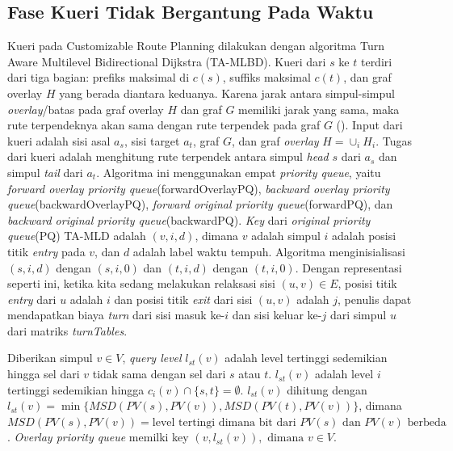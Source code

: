 \subsection{Fase Kueri Tidak Bergantung Pada Waktu}
\label{subsec:tdcrp-kueri}
Kueri pada Customizable Route Planning dilakukan dengan algoritma Turn Aware Multilevel Bidirectional Dijkstra (TA-MLBD). Kueri dari $s$ ke $t$ terdiri dari tiga bagian: prefiks maksimal di $c(s)$, suffiks maksimal $c(t)$, dan graf overlay $H$ yang berada diantara keduanya. Karena jarak antara simpul-simpul \textit{overlay}/batas pada graf overlay $H$ dan graf $G$ memiliki jarak yang sama, maka rute terpendeknya akan sama dengan rute terpendek pada graf $G$ (\cite{Delling2015}). Input dari kueri adalah sisi asal $a_s$, sisi target $a_t$, graf $G$, dan graf \textit{overlay} $H =\cup_i H_i$. Tugas dari kueri adalah menghitung rute terpendek antara simpul \textit{head} $s$ dari $a_s$ dan simpul \textit{tail} dari $a_t$. Algoritma ini menggunakan empat \textit{priority queue}, yaitu \textit{forward overlay priority queue}(forwardOverlayPQ), \textit{backward overlay priority queue}(backwardOverlayPQ), \textit{forward original priority queue}(forwardPQ), dan \textit{backward original priority queue}(backwardPQ). \textit{Key} dari \textit{original priority queue}(PQ) TA-MLD adalah $(v,i,d)$, dimana $v$ adalah simpul $i$ adalah posisi titik \textit{entry} pada $v$, dan $d$ adalah label waktu tempuh. Algoritma menginisialisasi $(s,i,d)$ dengan $(s,i,0)$ dan $(t,i,d)$ dengan $(t,i,0)$. Dengan representasi seperti ini, ketika kita sedang melakukan relaksasi sisi $(u,v)\in E$, posisi titik \textit{entry} dari $u$ adalah $i$ dan posisi titik \textit{exit} dari sisi $(u,v)$ adalah $j$, penulis dapat mendapatkan biaya \textit{turn}  dari sisi masuk ke-$i$ dan sisi keluar ke-$j$ dari simpul $u$  dari matriks \textit{turnTables}.

Diberikan simpul $v\in V$, \textit{query level} $l_{st}(v)$ adalah level tertinggi sedemikian hingga sel dari $v$ tidak sama dengan sel dari $s$ atau $t$. $l_{st}(v)$ adalah level $i$ tertinggi sedemikian hingga $c_i(v)\cap\{s,t\}=\emptyset$. $l_{st}(v)$ dihitung dengan $l_{st}(v)=\min\{MSD(PV(s), PV(v)), MSD(PV(t), PV(v))\}$, dimana $MSD(PV(s), PV(v))=\text{level tertingi dimana bit dari } PV(s) \text{ dan }PV(v) \text{ berbeda}$. \textit{Overlay priority queue} memilki key $(v, l_{st}(v)),\text{ dimana } v\in V$.

